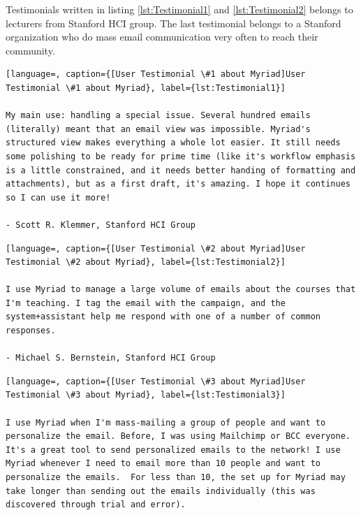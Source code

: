 Testimonials written in listing \ref{lst:Testimonial1} and \ref{lst:Testimonial2} belongs to lecturers from Stanford \ac{HCI} group. The last testimonial belongs to a Stanford organization who do mass email communication very often to reach their community.

\vspace{1cm}


\begin{lstlisting}[language=, caption={[User Testimonial \#1 about Myriad]User Testimonial \#1 about Myriad}, label={lst:Testimonial1}]

My main use: handling a special issue. Several hundred emails (literally) meant that an email view was impossible. Myriad's structured view makes everything a whole lot easier. It still needs some polishing to be ready for prime time (like it's workflow emphasis is a little constrained, and it needs better handing of formatting and attachments), but as a first draft, it's amazing. I hope it continues so I can use it more!

- Scott R. Klemmer, Stanford HCI Group
\end{lstlisting}

\vspace{1cm}

\begin{lstlisting}[language=, caption={[User Testimonial \#2 about Myriad]User Testimonial \#2 about Myriad}, label={lst:Testimonial2}]

I use Myriad to manage a large volume of emails about the courses that I'm teaching. I tag the email with the campaign, and the system+assistant help me respond with one of a number of common responses.

- Michael S. Bernstein, Stanford HCI Group
\end{lstlisting}

\vspace{1cm}

\begin{lstlisting}[language=, caption={[User Testimonial \#3 about Myriad]User Testimonial \#3 about Myriad}, label={lst:Testimonial3}]

I use Myriad when I'm mass-mailing a group of people and want to personalize the email. Before, I was using Mailchimp or BCC everyone. It's a great tool to send personalized emails to the network! I use Myriad whenever I need to email more than 10 people and want to personalize the emails.  For less than 10, the set up for Myriad may take longer than sending out the emails individually (this was discovered through trial and error).
\end{lstlisting}

